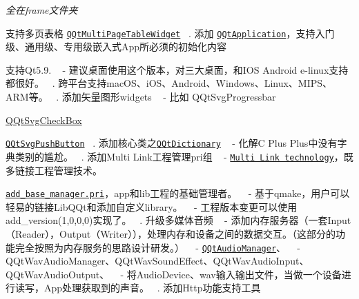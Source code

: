 {\itshape 全在frame文件夹}
\begin{DoxyEnumerate}
\item 支持多页表格 \href{src/widgets/qqtmultipagetablewidget.h}{\tt Q\+Qt\+Multi\+Page\+Table\+Widget} ~. 添加 \href{src/frame/qqtapplication.h}{\tt Q\+Qt\+Application}，支持入门级、通用级、专用级嵌入式\+App所必须的初始化内容
\end{DoxyEnumerate}
\begin{DoxyEnumerate}
\item 支持\+Qt5.9. ~\newline
 -\/ 建议桌面使用这个版本，对三大桌面，和\+I\+OS Android e-\/linux支持都很好。 ~. 跨平台支持mac\+O\+S、i\+O\+S、\+Android、\+Windows、\+Linux、\+M\+I\+P\+S、\+A\+R\+M等。 ~. 添加矢量图形widgets ~\newline
 -\/ 比如 Q\+Qt\+Svg\+Progressbar
\begin{DoxyItemize}
\item \mbox{\hyperlink{class_q_qt_svg_check_box}{Q\+Qt\+Svg\+Check\+Box}}
\item \href{src/exquisite/svgwidgets/qqtsvgpushbutton.h}{\tt Q\+Qt\+Svg\+Push\+Button} ~. 添加核心类之\href{src/core/qqtdictionary.h}{\tt Q\+Qt\+Dictionary} ~\newline
 -\/ 化解C Plus Plus中没有字典类别的尴尬。 ~. 添加\+Multi Link工程管理pri组 ~\newline
 -\/ \href{multi-link/add_multi_link_technology.pri}{\tt Multi Link technology}，既多链接工程管理技术。
\item \href{multi-link/multi-link/add_base_manager.pri}{\tt add\+\_\+base\+\_\+manager.\+pri}，app和lib工程的基础管理者。 ~\newline
 -\/ 基于qmake，用户可以轻易的链接\+Lib\+Q\+Qt和添加自定义library。 ~\newline
 -\/ 工程版本变更可以使用add\+\_\+version(1,0,0,0)实现了。 ~. 升级多媒体音频 ~\newline
 -\/ 添加内存服务器（一套\+Input（\+Reader），\+Output（\+Writer）），处理内存和设备之间的数据交互。（这部分的功能完全按照为内存服务的思路设计研发。） ~\newline
 -\/ \href{src/multimedia/qqtaudiomanager.h}{\tt Q\+Qt\+Audio\+Manager}、 ~\newline
 -\/ Q\+Qt\+Wav\+Audio\+Manager、\+Q\+Qt\+Wav\+Sound\+Effect、\+Q\+Qt\+Wav\+Audio\+Input、\+Q\+Qt\+Wav\+Audio\+Output、 ~\newline
 -\/ 将\+Audio\+Device、wav输入输出文件，当做一个设备进行读写，\+App处理获取到的声音。 ~. 添加\+Http功能支持工具
\end{DoxyItemize}
\end{DoxyEnumerate}

